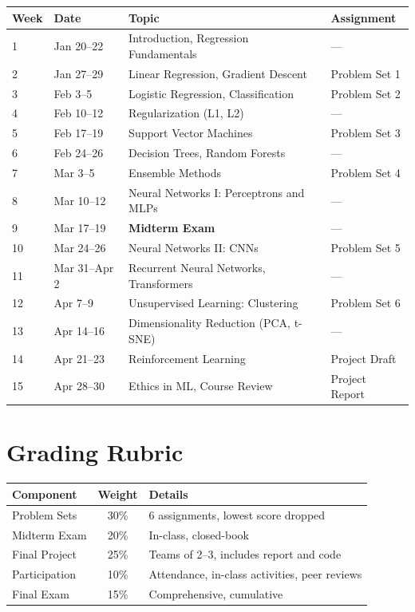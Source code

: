 \documentclass[
    language=english,
    doctype=curriculum,
    institution=none,
]{../../omnilatex}
\begin{document}
\begin{center}
\begin{tabular}{|l|l|l|l|}
\hline
\textbf{Week} & \textbf{Date} & \textbf{Topic} & \textbf{Assignment} \\
\hline
1 & Jan 20--22 & Introduction, Regression Fundamentals & --- \\
\hline
2 & Jan 27--29 & Linear Regression, Gradient Descent & Problem Set 1 \\
\hline
3 & Feb 3--5 & Logistic Regression, Classification & Problem Set 2 \\
\hline
4 & Feb 10--12 & Regularization (L1, L2) & --- \\
\hline
5 & Feb 17--19 & Support Vector Machines & Problem Set 3 \\
\hline
6 & Feb 24--26 & Decision Trees, Random Forests & --- \\
\hline
7 & Mar 3--5 & Ensemble Methods & Problem Set 4 \\
\hline
8 & Mar 10--12 & Neural Networks I: Perceptrons and MLPs & --- \\
\hline
9 & Mar 17--19 & \textbf{Midterm Exam} & --- \\
\hline
10 & Mar 24--26 & Neural Networks II: CNNs & Problem Set 5 \\
\hline
11 & Mar 31--Apr 2 & Recurrent Neural Networks, Transformers & --- \\
\hline
12 & Apr 7--9 & Unsupervised Learning: Clustering & Problem Set 6 \\
\hline
13 & Apr 14--16 & Dimensionality Reduction (PCA, t-SNE) & --- \\
\hline
14 & Apr 21--23 & Reinforcement Learning & Project Draft \\
\hline
15 & Apr 28--30 & Ethics in ML, Course Review & Project Report \\
\hline
\end{tabular}
\end{center}

\section{Grading Rubric}

\begin{center}
\begin{tabular}{|l|c|l|}
\hline
\textbf{Component} & \textbf{Weight} & \textbf{Details} \\
\hline
Problem Sets & 30\% & 6 assignments, lowest score dropped \\
\hline
Midterm Exam & 20\% & In-class, closed-book \\
\hline
Final Project & 25\% & Teams of 2--3, includes report and code \\
\hline
Participation & 10\% & Attendance, in-class activities, peer reviews \\
\hline
Final Exam & 15\% & Comprehensive, cumulative \\
\hline
\end{tabular}
\end{center}
\end{document}
